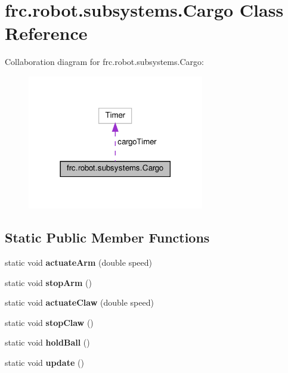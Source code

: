 \hypertarget{classfrc_1_1robot_1_1subsystems_1_1_cargo}{}\section{frc.\+robot.\+subsystems.\+Cargo Class Reference}
\label{classfrc_1_1robot_1_1subsystems_1_1_cargo}


Collaboration diagram for frc.\+robot.\+subsystems.\+Cargo\+:\nopagebreak
\begin{figure}[H]
\begin{center}
\leavevmode
\includegraphics[width=218pt]{classfrc_1_1robot_1_1subsystems_1_1_cargo__coll__graph}
\end{center}
\end{figure}
\subsection*{Static Public Member Functions}
\begin{DoxyCompactItemize}
\item 
\mbox{\label{classfrc_1_1robot_1_1subsystems_1_1_cargo_aa8640bc75e8b3f2472ea586936d6ed1f}} 
static void {\bfseries actuate\+Arm} (double speed)
\item 
\mbox{\label{classfrc_1_1robot_1_1subsystems_1_1_cargo_aa85a0b3aa7cb498f4b1c7eac6d26bce2}} 
static void {\bfseries stop\+Arm} ()
\item 
\mbox{\label{classfrc_1_1robot_1_1subsystems_1_1_cargo_aa05df516e815067a7b853d9fbdc35f01}} 
static void {\bfseries actuate\+Claw} (double speed)
\item 
\mbox{\label{classfrc_1_1robot_1_1subsystems_1_1_cargo_a0ac97ff2fa2f7af96744a5dcba7ba61b}} 
static void {\bfseries stop\+Claw} ()
\item 
\mbox{\label{classfrc_1_1robot_1_1subsystems_1_1_cargo_a8a4dd09c62967c4d82af8953cf8ab731}} 
static void {\bfseries hold\+Ball} ()
\item 
\mbox{\label{classfrc_1_1robot_1_1subsystems_1_1_cargo_a20e8230acdc07d7d94e056f9e09d91ad}} 
static void {\bfseries update} ()
\end{DoxyCompactItemize}
